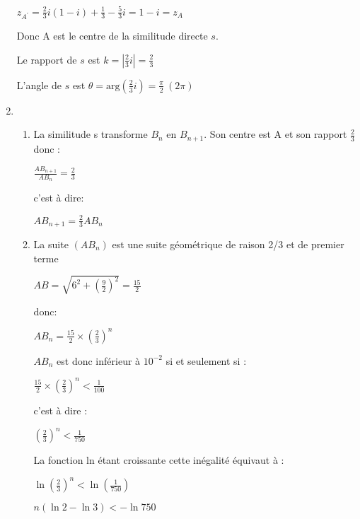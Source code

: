 \begin{corrige}
\begin{enumerate}
          \par
          $z_{A^{\prime}}=\frac{2}{3}i\left(1-i\right)+\frac{1}{3}-\frac{5}{3}i=1-i=z_{A}$
          \par
          Donc A est le centre de la similitude directe $s$.
          \par
          Le rapport de $s$ est $k=|\frac{2}{3}i|=\frac{2}{3}$
          \par
          L'angle de $s$ est $\theta =\text{arg}\left(\frac{2}{3}i\right)=\frac{\pi }{2}\ \left(2\pi \right)$
          \item
          \begin{enumerate}
               \item
               La similitude s transforme $B_{n}$ en $B_{n+1}$. Son centre est A et son rapport $\frac{2}{3}$ donc :
               \par
               $\frac{AB_{n+1}}{AB_{n}}=\frac{2}{3}$
               \par
               c'est à dire:
               \par
               $AB_{n+1}=\frac{2}{3}AB_{n}$
               \item
               La suite $\left(AB_{n}\right)$ est une suite géométrique de raison 2/3 et de premier terme
               \par
               $AB=\sqrt{6^{2}+\left(\frac{9}{2}\right)^{2}}=\frac{15}{2}$
               \par
               donc:
               \par
               $AB_{n}=\frac{15}{2}\times \left(\frac{2}{3}\right)^{n}$
               \par
               $AB_{n}$ est donc inférieur à $10^{-2}$ si et seulement si :
               \par
               $\frac{15}{2}\times \left(\frac{2}{3}\right)^{n} < \frac{1}{100}$
               \par
               c'est à dire :
               \par
               $\left(\frac{2}{3}\right)^{n} < \frac{1}{750}$
               \par
               La fonction ln étant croissante cette inégalité équivaut à :
               \par
               $\ln\left(\frac{2}{3}\right)^{n} < \ln\left(\frac{1}{750}\right)$
               \par
               $n\left(\ln2-\ln3\right) < -\ln750$
               \par

\end{enumerate}
\end{enumerate}
\end{corrige}
